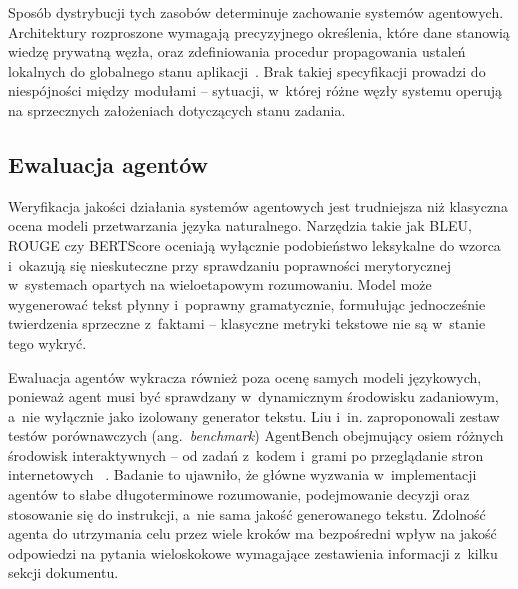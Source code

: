 Sposób dystrybucji tych zasobów determinuje zachowanie systemów agentowych.
Architektury rozproszone wymagają precyzyjnego określenia, które dane stanowią
wiedzę prywatną węzła, oraz zdefiniowania procedur propagowania ustaleń
lokalnych do globalnego stanu aplikacji~\cite{sumers2023cognitive,
  wang2024survey}. Brak takiej specyfikacji prowadzi do niespójności między
modułami -- sytuacji, w~której różne węzły systemu operują na sprzecznych
założeniach dotyczących stanu zadania.

\subsection{Ewaluacja agentów}\label{subsec:ewaluacja-agentow}

Weryfikacja jakości działania systemów agentowych jest trudniejsza niż
klasyczna ocena modeli przetwarzania języka naturalnego. Narzędzia takie jak
BLEU, ROUGE czy BERTScore oceniają wyłącznie podobieństwo leksykalne do
wzorca~\cite{papineni2002bleu, lin2004rouge} i~okazują się
nieskuteczne przy sprawdzaniu poprawności merytorycznej w~systemach opartych na
wieloetapowym rozumowaniu. Model może wygenerować tekst płynny i~poprawny
gramatycznie, formułując jednocześnie twierdzenia sprzeczne z~faktami --
klasyczne metryki tekstowe nie są w~stanie tego wykryć.

Ewaluacja agentów wykracza również poza ocenę samych modeli językowych,
ponieważ agent musi być sprawdzany w~dynamicznym środowisku zadaniowym, a~nie
wyłącznie jako izolowany generator tekstu. Liu i~in. zaproponowali zestaw
testów porównawczych (ang.~\textit{benchmark}) AgentBench obejmujący osiem
różnych środowisk interaktywnych -- od zadań z~kodem i~grami po przeglądanie
stron internetowych ~\cite{liu2023agentbench}. Badanie to ujawniło, że główne
wyzwania w~implementacji agentów to słabe długoterminowe rozumowanie,
podejmowanie decyzji oraz stosowanie się do instrukcji, a~nie sama jakość
generowanego tekstu. Zdolność agenta do utrzymania celu przez wiele kroków ma
bezpośredni wpływ na jakość odpowiedzi na pytania wieloskokowe wymagające
zestawienia informacji z~kilku sekcji dokumentu.

